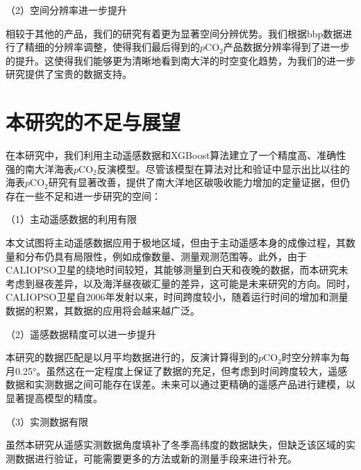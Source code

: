 （2）空间分辨率进一步提升

相较于其他的产品，我们的研究有着更为显著空间分辨优势。我们根据bbp数据进行了精细的分辨率调整，使得我们最后得到的$p\mathrm{CO_2}$产品数据分辨率得到了进一步的提升。这使得我们能够更为清晰地看到南大洋的时空变化趋势，为我们的进一步研究提供了宝贵的数据支持。

\section{本研究的不足与展望}
在本研究中，我们利用主动遥感数据和XGBoost算法建立了一个精度高、准确性强的南大洋海表$p\mathrm{CO_2}$反演模型。尽管该模型在算法对比和验证中显示出比以往的海表$p\mathrm{CO_2}$研究有显著改善，提供了南大洋地区碳吸收能力增加的定量证据，但仍存在一些不足和进一步研究的空间：

（1）主动遥感数据的利用有限

本文试图将主动遥感数据应用于极地区域，但由于主动遥感本身的成像过程，其数量和分布仍具有局限性，例如成像数量、测量观测范围等。此外，由于CALIOPSO卫星的绕地时间较短，其能够测量到白天和夜晚的数据，而本研究未考虑到昼夜差异，以及海洋昼夜碳汇量的差异，这可能是未来研究的方向。同时，CALIOPSO卫星自2006年发射以来，时间跨度较小，随着运行时间的增加和测量数据的积累，其数据的应用将会越来越广泛。

（2）遥感数据精度可以进一步提升

本研究的数据匹配是以月平均数据进行的，反演计算得到的$p\mathrm{CO_2}$时空分辨率为每月0.25°。虽然这在一定程度上保证了数据的充足，但考虑到时间跨度较大，遥感数据和实测数据之间可能存在误差。未来可以通过更精确的遥感产品进行建模，以显著提高模型的精度。

（3）实测数据有限

虽然本研究从遥感实测数据角度填补了冬季高纬度的数据缺失，但缺乏该区域的实测数据进行验证，可能需要更多的方法或新的测量手段来进行补充。





